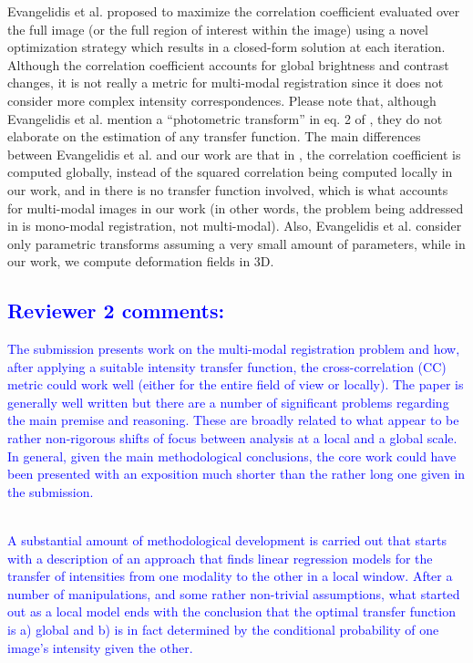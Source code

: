 \documentclass[onecolumn]{IEEEtran}
\begin{document}
Evangelidis et al. \cite{Evangelidis2008} proposed to maximize the correlation coefficient evaluated over the full image (or the full region of interest within the image) using a novel optimization strategy which results in a closed-form solution at each iteration. Although the correlation coefficient accounts for global brightness and contrast changes, it is not really a metric for multi-modal registration since it does not consider more complex intensity correspondences. Please note that, although Evangelidis et al. \cite{Evangelidis2008} mention a “photometric transform” in eq. 2 of \cite{Evangelidis2008}, they do not elaborate on the estimation of any transfer function. The main differences between Evangelidis et al. \cite{Evangelidis2008} and our work are that in \cite{Evangelidis2008}, the correlation coefficient is computed globally, instead of the squared correlation being computed locally in our work, and in \cite{Evangelidis2008} there is no transfer function involved, which is what accounts for multi-modal images in our work (in other words, the problem being addressed in \cite{Evangelidis2008} is mono-modal registration, not multi-modal). Also, Evangelidis et al. \cite{Evangelidis2008} consider only parametric transforms assuming a very small amount of parameters, while in our work, we compute deformation fields in 3D.\\


\textcolor{blue}{
\section{Reviewer 2 comments:}
The submission presents work on the multi-modal registration problem and how, after applying a suitable intensity transfer function, the cross-correlation (CC) metric could work well (either for the entire field of view or locally). The paper is generally well written but there are a number of significant problems regarding the main premise and reasoning. These are broadly related to what appear to be rather non-rigorous shifts of focus between analysis at a local and a global scale. In general, given the main methodological conclusions, the core work could have been presented with an exposition much shorter than the rather long one given in the submission.}\\

\textcolor{blue}{A substantial amount of methodological development is carried out that starts with a description of an approach that finds linear regression models for the transfer of intensities from one modality to the other in a local window. After a number of manipulations, and some rather non-trivial assumptions, what started out as a local model ends with the conclusion that the optimal transfer function is a) global and b) is in fact determined by the conditional probability of one image's intensity given the other.}\\
\end{document}
